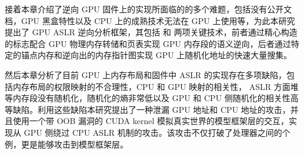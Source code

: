 接着本章介绍了逆向 GPU 固件上的实现所面临的的多个难题，包括没有公开文档，GPU 黑盒特性以及 CPU 上的成熟技术无法在 GPU 上使用等，为此本研究提出了 GPU ASLR 逆向分析框架，其包括  和  两项关键技术，前者通过精心构造的标志配合 GPU 物理内存转储和页表实现 GPU 内存段的语义逆向，后者通过特定的锚点内存和逆向出的内存指针图实现 GPU 上随机化地址的快速大量搜集。

然后本章分析了目前 GPU 上内存布局和固件中 ASLR 的实现存在多项缺陷，包括内存布局的权限映射的不合理性，CPU 和 GPU 映射的相关性， ASLR 方面堆等内存段没有随机化，随机化的熵非常低以及 GPU 和 CPU 侧随机化的相关性高等缺陷。利用这些缺陷本研究提出了一种泄漏 GPU 地址和 CPU 地址的攻击，并且使用一个带 OOB 漏洞的 CUDA kernel 模拟真实世界的模型框架层的交互，实现从 GPU 侧绕过 CPU ASLR 机制的攻击。该攻击不仅打破了处理器之间的个例，更是能够攻击到模型框架层。